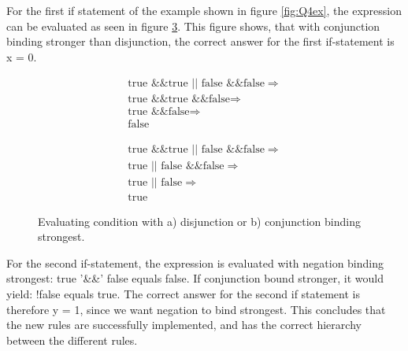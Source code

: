 For the first if statement of the example shown in figure \ref{fig:Q4ex}, the expression can be evaluated as seen in figure \ref{fig:Q4hierarchy}. This figure shows, that with conjunction binding stronger than disjunction, the correct answer for the first if-statement is x = 0.

\begin{figure}[H]
\begin{subfigure}{0.49\textwidth}
\begin{gather*}
     \text{true \&\& true $||$ false \&\& false} \Rightarrow\\
     \text{true \&\& true \&\& false} \Rightarrow\\
     \text{true \&\& false} \Rightarrow\\
     \text{false}
\end{gather*}
\vspace{-7mm}
\caption{}
\label{fig:dis}
\end{subfigure}
\begin{subfigure}{0.49\textwidth}
\begin{gather*}
     \text{true \&\& true $||$ false \&\& false} \Rightarrow\\
     \text{true $||$ false \&\& false} \Rightarrow\\
     \text{true $||$ false} \Rightarrow\\
     \text{true}
\end{gather*}
\vspace{-7mm}
\caption{}
\label{fig:con}
\end{subfigure}
 
\caption{Evaluating condition with a) disjunction or b) conjunction binding strongest.}
\label{fig:Q4hierarchy}
\end{figure}

For the second if-statement, the expression is evaluated with negation binding strongest: true '\&\&' false equals false. If conjunction bound stronger, it would yield:  !false equals true. The correct answer for the second if statement is therefore y = 1, since we want negation to bind strongest. This concludes that the new rules are successfully implemented, and has the correct hierarchy between the different rules.